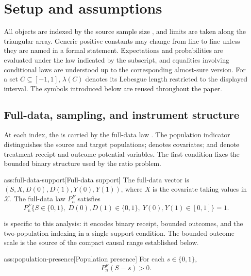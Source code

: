 \section{Setup and assumptions}

All objects are indexed by the source sample size , and limits are taken along the triangular array. Generic positive constants may change from line to line unless they are named in a formal statement. Expectations and probabilities are evaluated under the law indicated by the subscript, and equalities involving conditional laws are understood up to the corresponding almost-sure version. For a set \(C\subseteq[-1,1]\), \(\lambda(C)\) denotes its Lebesgue length restricted to the displayed interval. The symbols introduced below are reused throughout the paper.

\subsection{Full-data, sampling, and instrument structure}

At each index, the  is carried by the full-data law . The population indicator  distinguishes the source and target populations;  denotes covariates;  and  denote treatment-receipt and outcome potential variables. The first condition fixes the bounded binary structure used by the ratio problem.

\begin{assumptionv}{ass:full-data-support}[Full-data support]
The full-data vector is \((S,X,D(0),D(1),Y(0),Y(1))\), where \(X\) is the covariate taking values in \(\mathcal X\). The full-data law \(P_n^F\) satisfies
\[
P_n^F\{S\in\{0,1\},\ D(0),D(1)\in\{0,1\},\ Y(0),Y(1)\in[0,1]\}=1.
\]
\end{assumptionv}

 is specific to this analysis: it encodes binary receipt, bounded outcomes, and the two-population indexing in a single support condition. The bounded outcome scale is the source of the compact causal range established below.

\begin{assumptionv}{ass:population-presence}[Population presence]
For each \(s\in\{0,1\}\),
\[
P_n^F(S=s)>0.
\]
\end{assumptionv}

